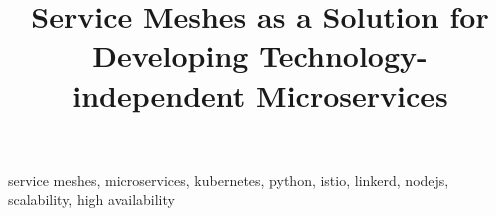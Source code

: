 \documentclass[conference]{IEEEtran}
\begin{document}
\title{Service Meshes as a Solution for Developing Technology-independent Microservices
}



\maketitle
\thispagestyle{plain}
\pagestyle{plain}



\begin{IEEEkeywords}
service meshes, microservices, kubernetes, python, istio, linkerd, nodejs, scalability, high availability
\end{IEEEkeywords}










\end{document}

